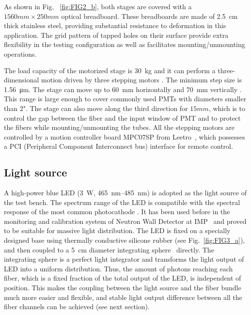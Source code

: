 \documentclass{nst}
\providecommand{\DIFadd}[1]{{\protect\color{yellow} \sf #1}} %
\providecommand{\DIFaddbegin}{} %
\providecommand{\DIFaddend}{} %
\providecommand{\DIFdelbegin}{} %
\providecommand{\DIFdelend}{} %
\begin{document}
As shown in Fig.~\DIFdelbegin \DIFdelend \DIFaddbegin \DIFadd{\ref{fig:FIG2_b}}\DIFaddend , both stages are covered with a $1560mm\times250mm$ optical breadboard. 
These breadboards are made of \SI{2.5}{cm} thick stainless steel, providing substantial resistance to deformation in this application. 
The grid pattern of tapped holes on their surface provide extra flexibility in the testing configuration as well as facilitates mounting/unmounting operations.

The load capacity of the motorized stage is \SI{30}{\kilo\gram} and it can \DIFdelbegin \DIFdelend \DIFaddbegin \DIFadd{perform }\DIFaddend a three-dimensional motion \DIFdelbegin \DIFdelend \DIFaddbegin \DIFadd{driven by }\DIFaddend three stepping motors\DIFdelbegin \DIFdelend \DIFaddbegin \DIFadd{. The minimum step size is }\DIFaddend \SI{1.56}{\micro\meter}.
The stage can move up to \SI{60}{\milli\meter} horizontally and \SI{70}{\milli\meter} vertically\DIFdelbegin \DIFdelend \DIFaddbegin \DIFadd{. This range is large }\DIFaddend enough to cover \DIFdelbegin \DIFdelend \DIFaddbegin \DIFadd{commonly used PMTs with diameters smaller than 2"}\DIFaddend .
The stage can also move along the third direction for $15mm$, which is to control the gap between the fiber and the input window of PMT and to protect the fibers while mounting/unmounting the tubes.
All the stepping motors are controlled by a motion controller board MPC07SP from Leetro~\cite{leetro}, which possesses a PCI (Peripheral Component Interconnect bus) interface for remote control.

\subsection{Light source}
\label{sec:light_source}

A high-power blue LED (\SI{3}{\watt}, \SIrange{465}{485}{\nano\meter}) is adopted as the light source of the test bench.
The spectrum range of the LED is compatible with the spectral response of the most common photocathode\DIFdelbegin \DIFdelend \DIFaddbegin \DIFadd{.
It }\DIFaddend has been used before in the monitoring and calibration system of Neutron Wall Detector at IMP~\cite{yuyuhong_led} and proved to be suitable for massive light distribution.
The LED is fixed on a \DIFdelbegin \DIFdelend \DIFaddbegin \DIFadd{specially }\DIFaddend designed base using thermally conductive silicone rubber (see Fig.~\ref{fig:FIG3_a}), and then coupled to a \SI{5}{\centi\meter} diameter integrating sphere~\cite{integrating_sphere} directly.
The integrating sphere is a perfect light integrator and transforms the light output of LED into a uniform distribution.
Thus, the amount of photons reaching each fiber, which is a fixed fraction of the total output of the LED, is independent of position.
This makes the coupling between the light source and the fiber bundle much more easier and flexible, and stable light output difference between all the fiber channels can be achieved (see next section).
\end{document}
